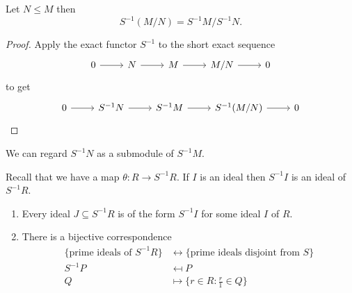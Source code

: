 \documentclass[a4paper]{article}
\begin{document}
\begin{corollary}
  Let \(N \leq M\) then
  \[
    S^{-1}(M/N) = S^{-1}M/S^{-1}N.
  \]
\end{corollary}

\begin{proof}
  Apply the exact functor \(S^{-1}\) to the short exact sequence
  \[
    \begin{tikzcd}
      0 \ar[r] & N \ar[r] & M \ar[r] & M/N \ar[r] & 0
    \end{tikzcd}
  \]
  to get
  \[
    \begin{tikzcd}
      0 \ar[r] & S^{-1}N \ar[r] & S^{-1}M \ar[r] & S^{-1}(M/N) \ar[r] & 0
    \end{tikzcd}
  \]
\end{proof}

\begin{remark}
  We can regard \(S^{-1}N\) as a submodule of \(S^{-1}M\).
\end{remark}

Recall that we have a map \(\theta: R \to S^{-1}R\). If \(I\) is an ideal then \(S^{-1}I\) is an ideal of \(S^{-1}R\).

\begin{lemma}\leavevmode
  \begin{enumerate}
  \item Every ideal \(J \subseteq S^{-1}R\) is of the form \(S^{-1}I\) for some ideal \(I\) of \(R\).
  \item There is a bijective correspondence
    \begin{align*}
      \{\text{prime ideals of } S^{-1}R\} &\longleftrightarrow \{\text{prime ideals disjoint from } S\} \\
      S^{-1}P &\mapsfrom P \\
      Q &\mapsto \{r \in R: \frac{r}{1} \in Q\}
    \end{align*}
  \end{enumerate}
\end{lemma}
\end{document}
